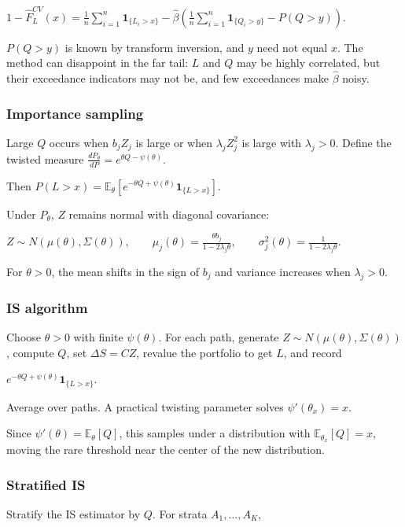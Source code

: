 $1-\hat F_L^{CV}(x)=\frac1n\sum_{i=1}^n\mathbf{1}_{\{L_i>x\}}-\hat\beta\left(\frac1n\sum_{i=1}^n\mathbf{1}_{\{Q_i>y\}}-P(Q>y)\right)$.

$P(Q>y)$ is known by transform inversion, and $y$ need not equal $x$. The method can disappoint in the far tail: $L$ and $Q$ may be highly correlated, but their exceedance indicators may not be, and few exceedances make $\hat\beta$ noisy.

\subsubsection*{Importance sampling}

Large $Q$ occurs when $b_jZ_j$ is large or when $\lambda_jZ_j^2$ is large with $\lambda_j>0$. Define the twisted measure
$\frac{dP_\theta}{dP}=e^{\theta Q-\psi(\theta)}$.

Then
$P(L>x)=\mathbb{E}_\theta\left[e^{-\theta Q+\psi(\theta)}\mathbf{1}_{\{L>x\}}\right]$.

Under $P_\theta$, $Z$ remains normal with diagonal covariance:

$Z\sim N(\mu(\theta),\Sigma(\theta)),\qquad \mu_j(\theta)=\frac{\theta b_j}{1-2\lambda_j\theta},\qquad \sigma_j^2(\theta)=\frac1{1-2\lambda_j\theta}$.

For $\theta>0$, the mean shifts in the sign of $b_j$ and variance increases when $\lambda_j>0$.

\subsubsection*{IS algorithm}

Choose $\theta>0$ with finite $\psi(\theta)$. For each path, generate $Z\sim N(\mu(\theta),\Sigma(\theta))$, compute $Q$, set $\Delta S=CZ$, revalue the portfolio to get $L$, and record

$e^{-\theta Q+\psi(\theta)}\mathbf{1}_{\{L>x\}}$.

Average over paths. A practical twisting parameter solves
$\psi'(\theta_x)=x$.

Since $\psi'(\theta)=\mathbb{E}_\theta[Q]$, this samples under a distribution with $\mathbb{E}_{\theta_x}[Q]=x$, moving the rare threshold near the center of the new distribution.

\subsubsection*{Stratified IS}

Stratify the IS estimator by $Q$. For strata $A_1,\ldots,A_K$,

